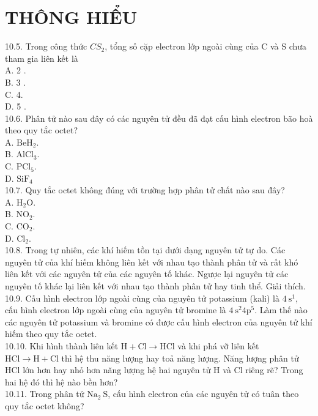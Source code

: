 \documentclass[10pt]{article}
\begin{document}
\section*{THÔNG HIỂU}
10.5. Trong công thức $C S_{2}$, tổng số cặp electron lớp ngoài cùng của C và S chưa tham gia liên kết là\\
A. 2 .\\
B. 3 .\\
C. 4.\\
D. 5 .\\
10.6. Phân tử nào sau đây có các nguyên tử đều đã đạt cấu hình electron bão hoà theo quy tắc octet?\\
A. $\mathrm{BeH}_{2}$.\\
B. $\mathrm{AlCl}_{3}$.\\
C. $\mathrm{PCl}_{5}$.\\
D. $\mathrm{SiF}_{4}$\\
10.7. Quy tắc octet không đúng với trường hợp phân tử chất nào sau đây?\\
A. $\mathrm{H}_{2} \mathrm{O}$.\\
B. $\mathrm{NO}_{2}$.\\
C. $\mathrm{CO}_{2}$.\\
D. $\mathrm{Cl}_{2}$.\\
10.8. Trong tự nhiên, các khí hiếm tồn tại dưới dạng nguyên tử tự do. Các nguyên tử của khí hiếm không liên kết với nhau tạo thành phân tử và rất khó liên kết với các nguyên tử của các nguyên tố khác. Ngược lại nguyên tử các nguyên tố khác lại liên kết với nhau tạo thành phân tử hay tinh thể. Giải thích.\\
10.9. Cấu hình electron lớp ngoài cùng của nguyên tử potassium (kali) là $4 \mathrm{~s}^{1}$, cấu hình electron lớp ngoài cùng của nguyên tử bromine là $4 \mathrm{~s}^{2} 4 \mathrm{p}^{5}$. Làm thế nào các nguyên tử potassium và bromine có được cấu hình electron của nguyên tử khí hiếm theo quy tắc octet.\\
10.10. Khi hình thành liên kết $\mathrm{H}+\mathrm{Cl} \rightarrow \mathrm{HCl}$ và khi phá vỡ liên kết $\mathrm{HCl} \rightarrow \mathrm{H}+\mathrm{Cl}$ thì hệ thu năng lượng hay toả năng lượng. Năng lượng phân tử HCl lớn hơn hay nhỏ hơn năng lượng hệ hai nguyên tử H và Cl riêng rẽ? Trong hai hệ đó thì hệ nào bền hơn?\\
10.11. Trong phân tử $\mathrm{Na}_{2} \mathrm{~S}$, cấu hình electron của các nguyên tử có tuân theo quy tắc octet không?
\end{document}

